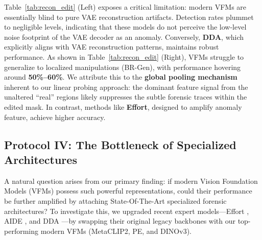 \documentclass[sigconf,screen]{acmart}
\theoremstyle{plain}
\theoremstyle{definition}
\theoremstyle{remark}
\begin{document}
Table~\ref{tab:recon_edit} (Left) exposes a critical limitation: modern VFMs are essentially blind to pure VAE reconstruction artifacts. Detection rates plummet to negligible levels, indicating that these models do not perceive the low-level noise footprint of the VAE decoder as an anomaly. Conversely, \textbf{DDA}, which explicitly aligns with VAE reconstruction patterns, maintains robust performance. As shown in Table~\ref{tab:recon_edit} (Right), VFMs struggle to generalize to localized manipulations (BR-Gen), with performance hovering around \textbf{50\%--60\%}. We attribute this to the \textbf{global pooling mechanism} inherent to our linear probing approach: the dominant feature signal from the unaltered ``real'' regions likely suppresses the subtle forensic traces within the edited mask. In contrast, methods like \textbf{Effort}, designed to amplify anomaly feature, achieve higher accuracy.


\subsection{Protocol IV: The Bottleneck of Specialized Architectures}
\label{subsec:ablation_architectures}

A natural question arises from our primary finding: if modern Vision Foundation Models (VFMs) possess such powerful representations, could their performance be further amplified by attaching State-Of-The-Art specialized forensic architectures? To investigate this, we upgraded recent expert models—Effort \cite{yan2024orthogonal}, AIDE \cite{yan2024sanity}, and DDA \cite{chen2025dual}—by swapping their original legacy backbones with our top-performing modern VFMs (MetaCLIP2, PE, and DINOv3).
\end{document}
